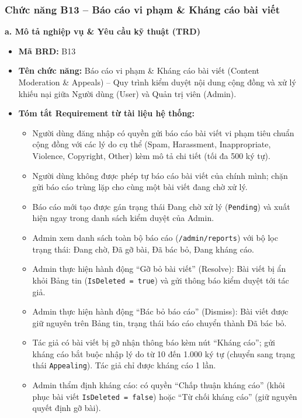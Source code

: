\documentclass[11pt,a4paper]{article}
\begin{document}
\subsubsection{Chức năng B13 -- Báo cáo vi phạm \& Kháng cáo bài viết}

\noindent\textbf{a. Mô tả nghiệp vụ \& Yêu cầu kỹ thuật (TRD)}
\begin{itemize}[leftmargin=1.2cm, noitemsep]
    \item[\textbf{--}] \textbf{Mã BRD:} B13
    \item[\textbf{--}] \textbf{Tên chức năng:} Báo cáo vi phạm \& Kháng cáo bài viết (Content Moderation \& Appeals) -- Quy trình kiểm duyệt nội dung cộng đồng và xử lý khiếu nại giữa Người dùng (User) và Quản trị viên (Admin).
    \item[\textbf{--}] \textbf{Tóm tắt Requirement từ tài liệu hệ thống:}
    \begin{itemize}[leftmargin=0.8cm, label=$\ast$, noitemsep]
        \item Người dùng đăng nhập có quyền gửi báo cáo bài viết vi phạm tiêu chuẩn cộng đồng với các lý do cụ thể (Spam, Harassment, Inappropriate, Violence, Copyright, Other) kèm mô tả chi tiết (tối đa 500 ký tự).
        \item Người dùng không được phép tự báo cáo bài viết của chính mình; chặn gửi báo cáo trùng lặp cho cùng một bài viết đang chờ xử lý.
        \item Báo cáo mới tạo được gán trạng thái Đang chờ xử lý (\texttt{Pending}) và xuất hiện ngay trong danh sách kiểm duyệt của Admin.
        \item Admin xem danh sách toàn bộ báo cáo (\texttt{/admin/reports}) với bộ lọc trạng thái: Đang chờ, Đã gỡ bài, Đã bác bỏ, Đang kháng cáo.
        \item Admin thực hiện hành động ``Gỡ bỏ bài viết'' (Resolve): Bài viết bị ẩn khỏi Bảng tin (\texttt{IsDeleted = true}) và gửi thông báo kiểm duyệt tới tác giả.
        \item Admin thực hiện hành động ``Bác bỏ báo cáo'' (Dismiss): Bài viết được giữ nguyên trên Bảng tin, trạng thái báo cáo chuyển thành Đã bác bỏ.
        \item Tác giả có bài viết bị gỡ nhận thông báo kèm nút ``Kháng cáo''; gửi kháng cáo bắt buộc nhập lý do từ 10 đến 1.000 ký tự (chuyển sang trạng thái \texttt{Appealing}). Tác giả chỉ được kháng cáo 1 lần.
        \item Admin thẩm định kháng cáo: có quyền ``Chấp thuận kháng cáo'' (khôi phục bài viết \texttt{IsDeleted = false}) hoặc ``Từ chối kháng cáo'' (giữ nguyên quyết định gỡ bài).
    \end{itemize}
\end{itemize}
\end{document}
